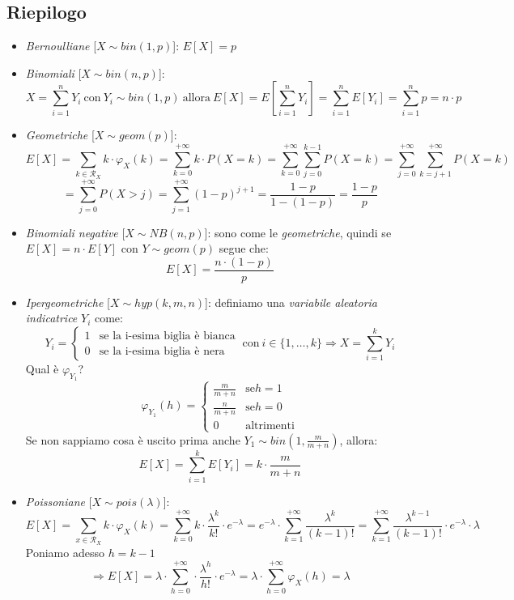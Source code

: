 \documentclass[12pt, a4paper]{report}
\theoremstyle{definition}
\DeclareRobustCommand{\supp}{\mathcal{R}}%
\begin{document}
\subsection{Riepilogo}
\begin{itemize}
	\item \emph{Bernoulliane} [$X\sim bin(1,p)$]: $E[X]=p$
	\item \emph{Binomiali} [$X\sim bin(n,p)$]:
	\[X=\sum_{i=1}^nY_i\ \text{con}\ Y_i\sim bin(1,p)\ \text{allora}\ E[X]=
	E\left[\sum_{i=1}^nY_i\right]=\sum_{i=1}^nE[Y_i]=\sum_{i=1}^np=n\cdot p\]
	\item \emph{Geometriche} [$X\sim geom(p)$]:
	\[E[X]=\sum_{k\in\supp_X}k\cdot \varphi_X(k)=\sum_{k=0}^{+\infty}k\cdot P(X=k)=\sum_
	{k=0}^{+\infty}\sum_{j=0}^{k-1}P(X=k)=\sum_{j=0}^{+\infty}\sum_{k=j+1}^
	{+\infty}P(X=k)\]
	\[=\sum_{j=0}^{+\infty}P(X>j)=\sum_{j=1}^{+\infty}(1-p)^{j+1}=\frac{1-p}
	{1-(1-p)}=\frac{1-p}{p}\]
	\item \emph{Binomiali negative} [$X\sim NB(n,p)$]: sono come le \emph
	{geometriche}, quindi se \(E[X]=n\cdot E[Y]\) con \(Y\sim geom(p)\) segue che:
	\[E[X]=\frac{n\cdot (1-p)}{p}\]
	\item \emph{Ipergeometriche} [$X\sim hyp(k,m,n)$]: definiamo una \emph{variabile
	aleatoria indicatrice} $Y_i$ come:
	\[Y_i=\begin{cases}
		{1} & \text{se la i-esima biglia è bianca}\\
		{0} & \text{se la i-esima biglia è nera}
	\end{cases}\ \text{con}\ i\in\{1,\dots,k\}\Rightarrow X=\sum_{i=1}^kY_i\]
	Qual è \(\varphi_{Y_1}\)?
	\[\varphi_{Y_1}(h)=\begin{cases}
		{\frac{m}{m+n}} & \text{se} {h=1}\\
		{\frac{n}{m+n}} & \text{se} {h=0}\\
		{0} & \text{altrimenti}
	\end{cases}\]
	Se non sappiamo cosa è uscito prima anche $Y_1\sim bin(1, \frac{m}{m+n})$,
	allora:
	\[E[X]=\sum_{i=1}^kE[Y_i]=k\cdot \frac{m}{m+n}\]
	\item \emph{Poissoniane} [$X\sim pois(\lambda)$]:
	\[E[X]=\sum_{x\in\supp_X}k\cdot \varphi_X(k)=\sum_{k=0}^{+\infty}k\cdot \frac{\lambda^k}
	{k!}\cdot e^{-\lambda}=e^{-\lambda}\cdot \sum_{k=1}^{+\infty}\frac{\lambda^k}{(k-1)!}
	=\sum_{k=1}^{+\infty}\frac{\lambda^{k-1}}{(k-1)!}\cdot e^{-\lambda}\cdot \lambda\]
	Poniamo adesso $h=k-1$
	\[\Rightarrow E[X]=\lambda\cdot \sum_{h=0}^{+\infty}\cdot \frac{\lambda^h}{h!}\cdot e^
	{-\lambda}=\lambda\cdot \sum_{h=0}^{+\infty}\varphi_X(h)=\lambda\]
\end{itemize}
\end{document}
